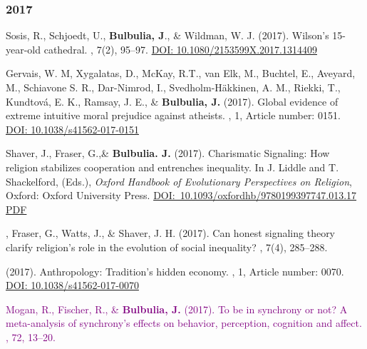 \documentclass{article}
\begin{document}
\begin{thebibliography}{99}
\subsubsection*{2017}


Sosis, R., Schjoedt, U., {\bf Bulbulia, J}., \& Wildman, W. J. (2017).
\newblock Wilson’s 15-year-old cathedral.
, 7(2), 95--97.
\href{https://doi.org/10.1080/2153599X.2017.1314409}{DOI: 10.1080/2153599X.2017.1314409}


Gervais, W. M, Xygalatas, D., McKay, R.T.,  van Elk, M., Buchtel, E., Aveyard, M., Schiavone S. R.,  Dar-Nimrod, I.,  Svedholm-H{\"a}kkinen, A. M., Riekki, T., Kundtov{\'a}, E. K.,  Ramsay, J. E., \& {\bf Bulbulia, J.} (2017).
\newblock Global evidence of extreme intuitive moral prejudice against atheists.
, 1, Article number: 0151. 
\href{https://doi.org/10.1038/s41562-017-0151}{DOI: 10.1038/s41562-017-0151}


Shaver, J., Fraser, G.,\&  {\bf Bulbulia. J.} (2017). 
\newblock Charismatic Signaling: How religion stabilizes cooperation and entrenches inequality. 
\newblock In J. Liddle and T. Shackelford, (Eds.), {\em Oxford Handbook of Evolutionary Perspectives on Religion},  Oxford: Oxford University Press. 
\newblock \href{https://doi.org/10.1093/oxfordhb/9780199397747.013.17}{DOI:~10.1093/oxfordhb/9780199397747.013.17}
\href{https://www.dropbox.com/s/bnxz7r89jdt93uj/oxfordhb-9780199397747-e-17.pdf?dl=0}{PDF}


, Fraser, G., Watts, J., \& Shaver, J. H. (2017). 
\newblock Can honest signaling theory clarify religion's role in the evolution of social inequality? 
, 7(4), 285--288.


 (2017). 
\newblock Anthropology: Tradition's hidden economy. 
, 1, Article number: 0070. 
\href{https://doi.org/10.1038/s41562-017-0070}{DOI: 10.1038/s41562-017-0070}


\textcolor{Purple}{
Mogan, R., Fischer, R., \& {\bf Bulbulia, J.} (2017). 
\newblock To be in synchrony or not? A meta-analysis of synchrony's effects on behavior, perception, cognition and affect.
, 72, 13--20.}



\end{thebibliography}
\end{document}
